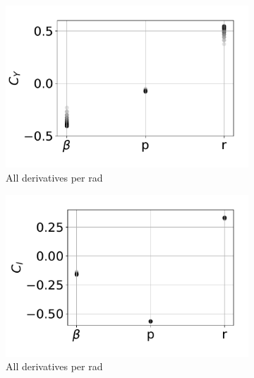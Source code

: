\begin{figure}[hbt!]
	\centering
	\begin{subfigure}[b]{0.33\textwidth}
		\includegraphics[width=\textwidth]{CyCstSpan}
		\caption{All derivatives per rad}
		\label{fig:CyCstSpan}
	\end{subfigure}
	\begin{subfigure}[b]{0.33\textwidth}
		\includegraphics[width=\textwidth]{ClCstSpan}
		\caption{All derivatives per rad}
		\label{fig:ClCstSpan}
	\end{subfigure}
	\begin{subfigure}[b]{0.33\textwidth}

\end{subfigure}
\end{figure}

